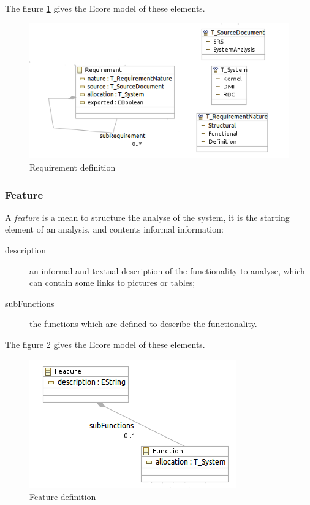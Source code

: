 The figure \ref{fig:requirement} gives the Ecore model of these elements.

\begin{figure}[ht]
  \centering
  \includegraphics{DataModel/Requirement1.png}
  \caption{Requirement definition}
  \label{fig:requirement}
\end{figure}


\subsubsection{Feature}

A \textit{feature} is a mean to structure the analyse of the system, it is the starting element of an analysis, and contents informal information:
\begin{description}
\item[description] an informal and textual description of the functionality to analyse, which can contain some links to pictures or tables;
\item[subFunctions] the functions which are defined to describe the functionality.
\end{description}

The figure \ref{fig:feature} gives the Ecore model of these elements.

\begin{figure}[ht]
  \centering
  \includegraphics{DataModel/Feature1.png}
  \caption{Feature definition}
  \label{fig:feature}
\end{figure}

